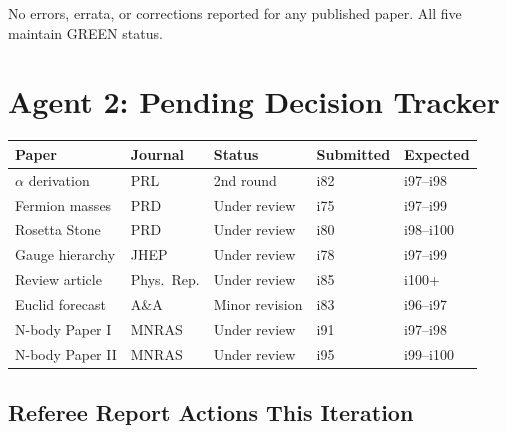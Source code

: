 \documentclass[11pt,a4paper]{article}
\begin{document}
No errors, errata, or corrections reported for any published paper. All five maintain GREEN status.

\section{Agent 2: Pending Decision Tracker}

\begin{tcolorbox}[colback=blue!5!white, colframe=dfdblue, title=\textbf{FULL DECISION TRACKING: ALL PAPERS UNDER REVIEW}]

\begin{center}
\begin{tabular}{lllll}
\toprule
\textbf{Paper} & \textbf{Journal} & \textbf{Status} & \textbf{Submitted} & \textbf{Expected} \\
\midrule
$\alpha$ derivation & PRL & 2nd round & i82 & i97--i98 \\
Fermion masses & PRD & Under review & i75 & i97--i99 \\
Rosetta Stone & PRD & Under review & i80 & i98--i100 \\
Gauge hierarchy & JHEP & Under review & i78 & i97--i99 \\
Review article & Phys.\ Rep. & Under review & i85 & i100+ \\
Euclid forecast & A\&A & Minor revision & i83 & i96--i97 \\
N-body Paper I & MNRAS & Under review & i91 & i97--i98 \\
N-body Paper II & MNRAS & Under review & i95 & i99--i100 \\
\bottomrule
\end{tabular}
\end{center}
\end{tcolorbox}

\subsection{Referee Report Actions This Iteration}
\end{document}
